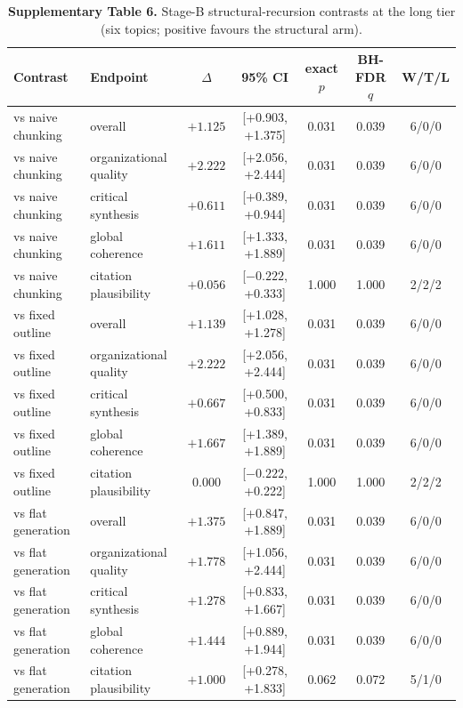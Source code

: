 \documentclass[11pt,a4paper]{article}
\begin{document}
\begin{table}[h]
\caption*{\textbf{Supplementary Table 6.} Stage-B structural-recursion contrasts at the long tier (six topics; positive favours the structural arm).}
\centering
\small
\begin{tabular}{@{}llccccc@{}}
\toprule
Contrast & Endpoint & $\Delta$ & 95\% CI & exact $p$ & BH-FDR $q$ & W/T/L \\
\midrule
vs naive chunking & overall & $+1.125$ & [+0.903, +1.375] & 0.031 & 0.039 & 6/0/0 \\
vs naive chunking & organizational quality & $+2.222$ & [+2.056, +2.444] & 0.031 & 0.039 & 6/0/0 \\
vs naive chunking & critical synthesis & $+0.611$ & [+0.389, +0.944] & 0.031 & 0.039 & 6/0/0 \\
vs naive chunking & global coherence & $+1.611$ & [+1.333, +1.889] & 0.031 & 0.039 & 6/0/0 \\
vs naive chunking & citation plausibility & $+0.056$ & [$-0.222$, +0.333] & 1.000 & 1.000 & 2/2/2 \\
\midrule
vs fixed outline & overall & $+1.139$ & [+1.028, +1.278] & 0.031 & 0.039 & 6/0/0 \\
vs fixed outline & organizational quality & $+2.222$ & [+2.056, +2.444] & 0.031 & 0.039 & 6/0/0 \\
vs fixed outline & critical synthesis & $+0.667$ & [+0.500, +0.833] & 0.031 & 0.039 & 6/0/0 \\
vs fixed outline & global coherence & $+1.667$ & [+1.389, +1.889] & 0.031 & 0.039 & 6/0/0 \\
vs fixed outline & citation plausibility & $0.000$ & [$-0.222$, +0.222] & 1.000 & 1.000 & 2/2/2 \\
\midrule
vs flat generation & overall & $+1.375$ & [+0.847, +1.889] & 0.031 & 0.039 & 6/0/0 \\
vs flat generation & organizational quality & $+1.778$ & [+1.056, +2.444] & 0.031 & 0.039 & 6/0/0 \\
vs flat generation & critical synthesis & $+1.278$ & [+0.833, +1.667] & 0.031 & 0.039 & 6/0/0 \\
vs flat generation & global coherence & $+1.444$ & [+0.889, +1.944] & 0.031 & 0.039 & 6/0/0 \\
vs flat generation & citation plausibility & $+1.000$ & [+0.278, +1.833] & 0.062 & 0.072 & 5/1/0 \\
\bottomrule
\end{tabular}
\end{table}
\end{document}

